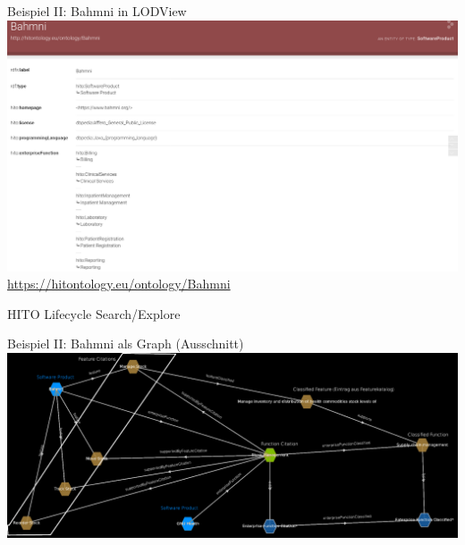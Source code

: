 \documentclass[aspectratio=1610,12pt]{beamer}
\begin{document}
\begin{frame}{Beispiel II: Bahmni in LODView}
  \vspace{-0.3cm}
  \centering
  \includegraphics[width=.95\textwidth]{img/bahmni.png}
  \footnotesize{\url{https://hitontology.eu/ontology/Bahmni}}
\end{frame}

\begin{frame}{HITO Lifecycle Search/Explore}
  \centering
  \vspace{-0.5cm}
\end{frame}

%

\begin{frame}{Beispiel II: Bahmni als Graph (Ausschnitt)}
  \includegraphics[width=\textwidth, height=.65\textheight]{img/bahmni_star_labelled.png}
\end{frame}
\end{document}
